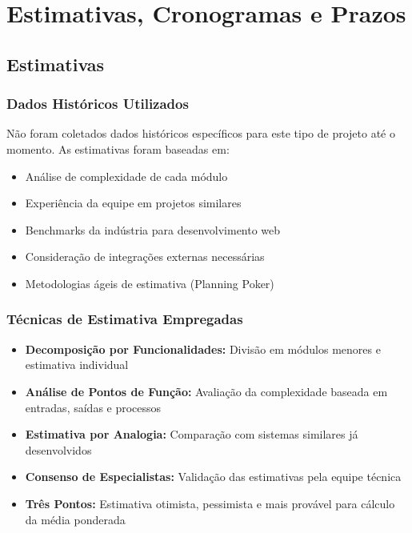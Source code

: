 \section{Estimativas, Cronogramas e Prazos}

\subsection{Estimativas}

\subsubsection{Dados Históricos Utilizados}
Não foram coletados dados históricos específicos para este tipo de projeto até o momento. As estimativas foram baseadas em:
\begin{itemize}
    \item Análise de complexidade de cada módulo
    \item Experiência da equipe em projetos similares
    \item Benchmarks da indústria para desenvolvimento web
    \item Consideração de integrações externas necessárias
    \item Metodologias ágeis de estimativa (Planning Poker)
\end{itemize}

\subsubsection{Técnicas de Estimativa Empregadas}
\begin{itemize}
    \item \textbf{Decomposição por Funcionalidades:} Divisão em módulos menores e estimativa individual
    \item \textbf{Análise de Pontos de Função:} Avaliação da complexidade baseada em entradas, saídas e processos
    \item \textbf{Estimativa por Analogia:} Comparação com sistemas similares já desenvolvidos
    \item \textbf{Consenso de Especialistas:} Validação das estimativas pela equipe técnica
    \item \textbf{Três Pontos:} Estimativa otimista, pessimista e mais provável para cálculo da média ponderada
\end{itemize}

